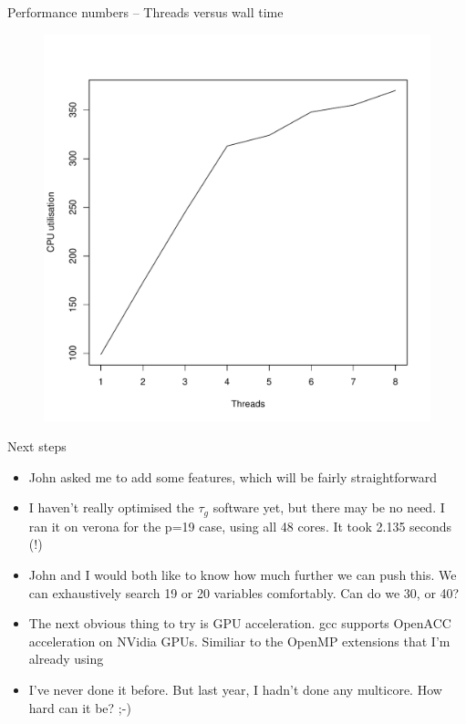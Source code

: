 \documentclass{beamer}
\begin{document}
\begin{frame}{Performance numbers -- Threads versus wall time}
\begin{figure}
\includegraphics[scale=0.45]{code/threads_versus_utilisation.pdf}
\end{figure}

\end{frame}

\begin{frame}{Next steps}
\begin{itemize}
\item John asked me to add some features, which will be fairly straightforward
\item I haven't really optimised the $\tau_g$ software yet, but there may be no need.
I ran it on verona for the p=19 case, using all 48 cores. It took 2.135 seconds (!)
\item John and I would both like to know how much further we can push this. We can exhaustively search 19 or 
20 variables comfortably. Can do we 30, or 40?
\item The next obvious thing to try is GPU acceleration. gcc supports OpenACC acceleration on NVidia GPUs. 
Similiar to the OpenMP extensions that I'm already using
\item I've never done it before. But last year, I hadn't done any multicore. How hard can it be? ;-)
\end{itemize}
\end{frame}
\end{document}
